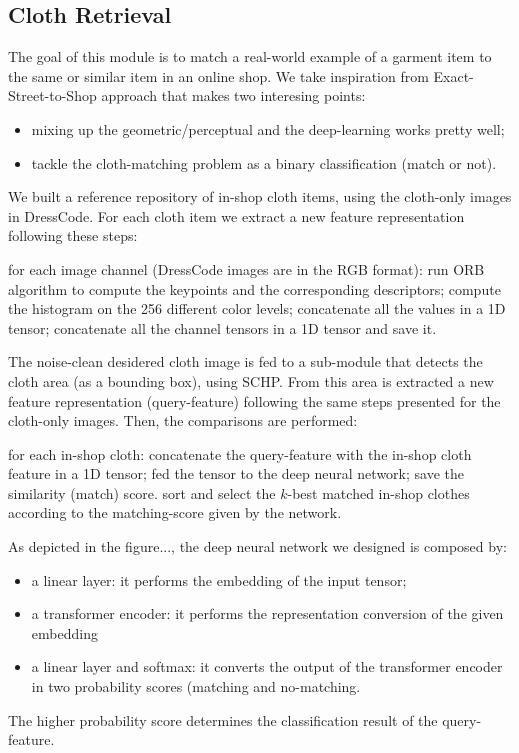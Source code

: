 \subsection{Cloth Retrieval}

The goal of this module is to match a real-world example of a garment item to the same or similar item in an online shop. We take inspiration from Exact-Street-to-Shop approach that makes two interesing points:
\begin{itemize}[noitemsep]
	\item mixing up the geometric/perceptual and the deep-learning works pretty well;
	\item tackle the cloth-matching problem as a binary classification (match or not).
\end{itemize}

We built a reference repository of in-shop cloth items, using the cloth-only images in DressCode. For each cloth item we extract a new feature representation following these steps:
\begin{outline}
 \1 for each image channel (DressCode images are in the RGB format):
   \2 run ORB algorithm to compute the keypoints and the corresponding descriptors;
   \2 compute the histogram on the 256 different color levels;
   \2 concatenate all the values in a 1D tensor;
 \1 concatenate all the channel tensors in a 1D tensor and save it.
\end{outline}

The noise-clean desidered cloth image is fed to a sub-module that detects the cloth area (as a bounding box), using SCHP. From this area is extracted a new feature representation (query-feature) following the same steps presented for the cloth-only images. Then, the comparisons are performed:
\begin{outline}
\1 for each in-shop cloth:
	\2 concatenate the query-feature with the in-shop cloth feature in a 1D tensor;
	\2 fed the tensor to the deep neural network;
	\2 save the similarity (match) score.
\1 sort and select the $k$-best matched in-shop clothes according to the matching-score given by the network. 
\end{outline}
As depicted in the figure..., the deep neural network we designed is composed by:
\begin{itemize}
	\item{a linear layer: it performs the embedding of the input tensor;}
	\item{a transformer encoder: it performs the representation conversion of the given embedding}
	\item{a linear layer and softmax: it converts the output of the transformer encoder in two probability scores (matching and no-matching.}
\end{itemize}
The higher probability score determines the classification result of the query-feature.

